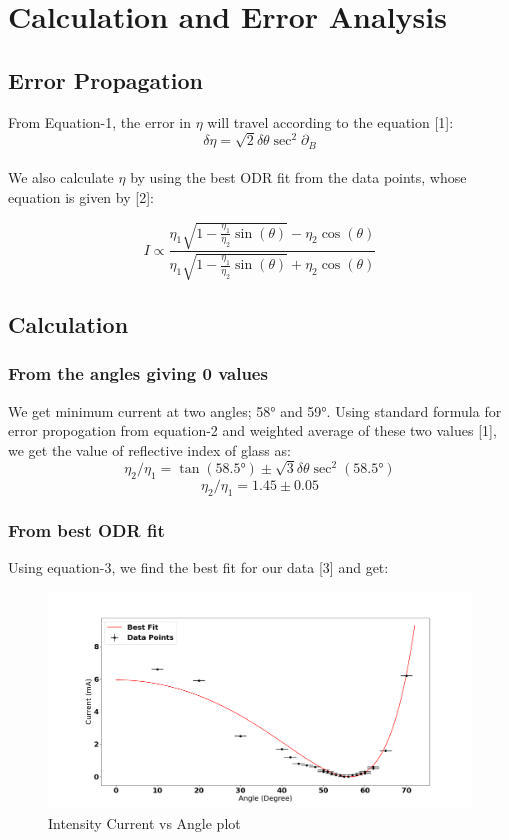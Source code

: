 \documentclass[%
sor,
 jor,
 amsmath,amssymb,
 reprint,
]{revtex4-2}
\begin{document}
\section{Calculation and Error Analysis}
\subsection{Error Propagation}
From Equation-1, the error in $ \eta$ will travel according to the equation [1]: 
\begin{equation}\delta \eta = \sqrt 2  \delta \theta \sec^2 \partial_B\end{equation}\\ 
We also calculate $\eta$ by using the best ODR fit from the data points, whose equation is given by [2]: 

\begin{equation}
	I \propto \frac{\eta_1\sqrt{1-\frac {\eta_1} {\eta_2} \sin(\theta) } - \eta_2 \cos(\theta) } {\eta_1\sqrt{1-\frac {\eta_1} {\eta_2} \sin(\theta) } + \eta_2 \cos(\theta) }	
\end{equation}
\subsection{Calculation}
\subsubsection{From the angles giving 0 values}
We get minimum current at two angles; 58\si{\degree} and 59\si{\degree}. Using standard formula for error propogation from equation-2 and weighted average of these two values [1], we get the value of reflective index of glass as: 
$$\eta_2/\eta_1 = \tan(58.5\si{\degree}) \pm \sqrt 3 \delta \theta \sec^2(58.5\si{\degree})$$
$$\eta_2/\eta_1 = 1.45 \pm 0.05  $$
\subsubsection{From best ODR fit}
Using equation-3, we find the best fit for our data [3] and get: 
\begin{figure}[h!]
\centering
\includegraphics[scale=0.33]{fig}
\caption{Intensity Current vs Angle plot}
\end{figure}\\
\end{document}
